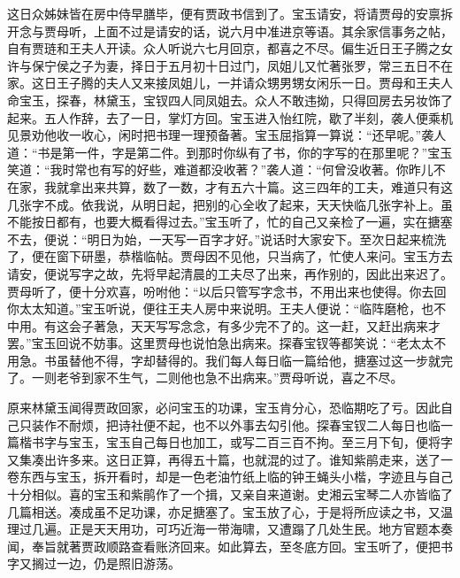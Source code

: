 \begin{parag}
    这日众姊妹皆在房中侍早膳毕，便有贾政书信到了。宝玉请安，将请贾母的安禀拆开念与贾母听，上面不过是请安的话，说六月中准进京等语。其余家信事务之帖，自有贾琏和王夫人开读。众人听说六七月回京，都喜之不尽。偏生近日王子腾之女许与保宁侯之子为妻，择日于五月初十日过门，凤姐儿又忙著张罗，常三五日不在家。这日王子腾的夫人又来接凤姐儿，一并请众甥男甥女闲乐一日。贾母和王夫人命宝玉，探春，林黛玉，宝钗四人同凤姐去。众人不敢违拗，只得回房去另妆饰了起来。五人作辞，去了一日，掌灯方回。宝玉进入怡红院，歇了半刻，袭人便乘机见景劝他收一收心，闲时把书理一理预备著。宝玉屈指算一算说：“还早呢。”袭人道：“书是第一件，字是第二件。到那时你纵有了书，你的字写的在那里呢？”宝玉笑道：“我时常也有写的好些，难道都没收著？”袭人道：“何曾没收著。你昨儿不在家，我就拿出来共算，数了一数，才有五六十篇。这三四年的工夫，难道只有这几张字不成。依我说，从明日起，把别的心全收了起来，天天快临几张字补上。虽不能按日都有，也要大概看得过去。”宝玉听了，忙的自己又亲检了一遍，实在搪塞不去，便说：“明日为始，一天写一百字才好。”说话时大家安下。至次日起来梳洗了，便在窗下研墨，恭楷临帖。贾母因不见他，只当病了，忙使人来问。宝玉方去请安，便说写字之故，先将早起清晨的工夫尽了出来，再作别的，因此出来迟了。贾母听了，便十分欢喜，吩咐他：“以后只管写字念书，不用出来也使得。你去回你太太知道。”宝玉听说，便往王夫人房中来说明。王夫人便说：“临阵磨枪，也不中用。有这会子著急，天天写写念念，有多少完不了的。这一赶，又赶出病来才罢。”宝玉回说不妨事。这里贾母也说怕急出病来。探春宝钗等都笑说：“老太太不用急。书虽替他不得，字却替得的。我们每人每日临一篇给他，搪塞过这一步就完了。一则老爷到家不生气，二则他也急不出病来。”贾母听说，喜之不尽。
\end{parag}


\begin{parag}
    原来林黛玉闻得贾政回家，必问宝玉的功课，宝玉肯分心，恐临期吃了亏。因此自己只装作不耐烦，把诗社便不起，也不以外事去勾引他。探春宝钗二人每日也临一篇楷书字与宝玉，宝玉自己每日也加工，或写二百三百不拘。至三月下旬，便将字又集凑出许多来。这日正算，再得五十篇，也就混的过了。谁知紫鹃走来，送了一卷东西与宝玉，拆开看时，却是一色老油竹纸上临的钟王蝇头小楷，字迹且与自己十分相似。喜的宝玉和紫鹃作了一个揖，又亲自来道谢。史湘云宝琴二人亦皆临了几篇相送。凑成虽不足功课，亦足搪塞了。宝玉放了心，于是将所应读之书，又温理过几遍。正是天天用功，可巧近海一带海啸，又遭蹋了几处生民。地方官题本奏闻，奉旨就著贾政顺路查看账济回来。如此算去，至冬底方回。宝玉听了，便把书字又搁过一边，仍是照旧游荡。
\end{parag}


